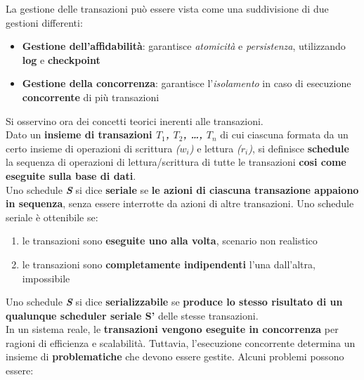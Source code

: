 \documentclass{article}
\begin{document}
La gestione delle transazioni può essere vista come una suddivisione di due gestioni differenti:
\begin{itemize}[label={-}, leftmargin=1cm]
    \item \textbf{Gestione dell'affidabilità}: garantisce \textit{atomicità} e \textit{persistenza}, utilizzando \textbf{log} e \textbf{checkpoint}
    \item \textbf{Gestione della concorrenza}: garantisce l'\textit{isolamento} in caso di esecuzione \textbf{concorrente} di più transazioni\\
\end{itemize}
Si osservino ora dei concetti teorici inerenti alle transazioni.\\
Dato un \textbf{insieme di transazioni \textit{$T_1$, $T_2$, \dots, $T_n$}} di cui ciascuna formata da un certo insieme di operazioni di scrittura \textit{($w_i$)} e lettura \textit{($r_i$)}, si definisce \textbf{schedule} la sequenza di operazioni di lettura/scrittura di tutte le transazioni \textbf{cosi come eseguite sulla base di dati}.\vspace{14pt}\\
Uno schedule \textbf{\textit{S}} si dice \textbf{seriale} se \textbf{le azioni di ciascuna transazione appaiono in sequenza}, senza essere interrotte da azioni di altre transazioni. Uno schedule seriale è ottenibile se:
\begin{enumerate}[leftmargin=1cm]
    \item le transazioni sono \textbf{eseguite uno alla volta}, scenario non realistico
    \item le transazioni sono \textbf{completamente indipendenti} l'una dall'altra, impossibile
\end{enumerate}
Uno schedule \textbf{\textit{S}} si dice \textbf{serializzabile} se \textbf{produce lo stesso risultato di un qualunque scheduler seriale S'} delle stesse transazioni.\vspace{14pt}\\
In un sistema reale, le \textbf{transazioni vengono eseguite in concorrenza} per ragioni di efficienza e scalabilità. Tuttavia, l'esecuzione concorrente determina un insieme di \textbf{problematiche} che devono essere gestite. Alcuni problemi possono essere:
\end{document}
